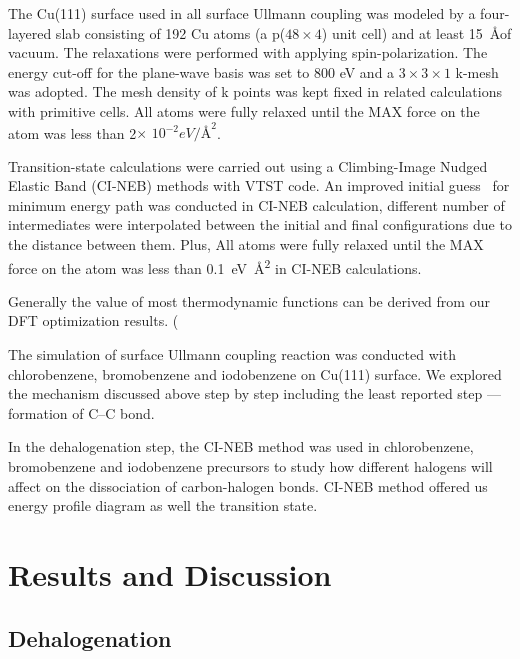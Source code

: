 \documentclass[%
 reprint,
 amsmath,amssymb,
 aps,
prb,
]{revtex4-2}
\begin{document}
The Cu(111) surface used in all surface Ullmann coupling was 
modeled by a four-layered slab consisting of 192 Cu atoms (a p($48\times 4$) unit cell) and at least 15~\AA of vacuum. The relaxations were performed with applying spin-polarization. The energy cut-off for the plane-wave basis was set to 800 eV and a $3\times 3 \times1$ k-mesh was adopted. The mesh density of k points was kept fixed in related calculations with primitive cells. All atoms were fully relaxed until the MAX force on the atom was less than 2$\times$ $10^{-2} eV/\si{\angstrom}^{2}$. 

Transition-state calculations were carried out using a Climbing-Image Nudged Elastic Band (CI-NEB) methods with VTST code\cite{ullmann_59}. An improved initial guess~\cite{ullmann_60} for minimum energy path was conducted in CI-NEB calculation, different number of intermediates were interpolated between the initial and final configurations due to the distance between them. Plus, All atoms were fully relaxed until the MAX force on the atom was less than 0.1~\si{\eV\square\angstrom} in CI-NEB calculations.

Generally the value of most thermodynamic functions can be derived from our DFT optimization results. 
(%

The simulation of surface Ullmann coupling reaction was conducted with chlorobenzene, bromobenzene and iodobenzene on Cu(111) surface. We explored the mechanism discussed above step by step including the least reported step --- formation of C--C bond.

In the dehalogenation step, the CI-NEB method was used in chlorobenzene, bromobenzene and iodobenzene precursors to study how different halogens will affect on the dissociation of carbon-halogen bonds. CI-NEB method offered us energy profile diagram as well the transition state.

\section{Results and Discussion}

\subsection{Dehalogenation}
\end{document}
